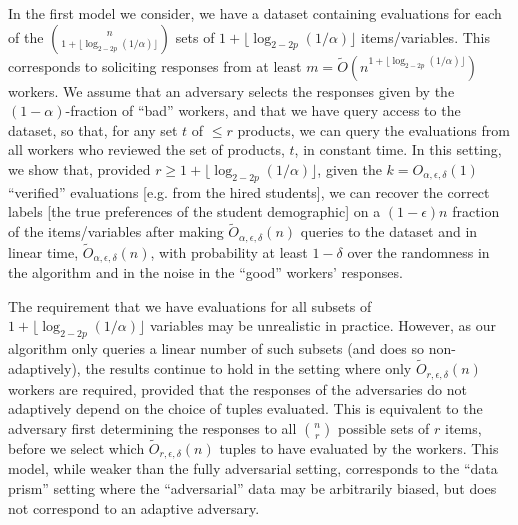 \documentclass[final,12pt]{colt2018}
\newcommand{\eps}{\epsilon}
\begin{document}
In the first model we consider, we have a dataset containing evaluations for each of the ${n \choose 1+\lfloor \log_{2-2p}(1/\alpha)\rfloor}$ sets of $1+\lfloor \log_{2-2p}(1/\alpha)\rfloor$ items/variables.  This corresponds to soliciting responses from at least $m = \tilde{O}\left(n^{1+\lfloor \log_{2-2p}(1/\alpha)\rfloor} \right)$ workers.  We assume that an adversary selects the responses given by the $(1-\alpha)$-fraction of ``bad'' workers, and that we have query access to the dataset, so that, for any set $t$ of $\le r$ products, we can query the evaluations from all workers who reviewed the set of products, $t$, in constant time. In this setting, we show that, provided $r\ge 1+\lfloor \log_{2-2p}(1/\alpha)\rfloor$, given the $k=O_{\alpha,\eps,\delta}(1)$ ``verified'' evaluations [e.g. from the hired students], we can recover the correct labels [the true preferences of the student demographic] on a $(1-\eps)n$ fraction of the items/variables after making $\tilde{O}_{\alpha,\eps,\delta}(n)$ queries to the dataset and in linear time, $\tilde{O}_{\alpha,\eps,\delta}(n)$, with probability at least $1-\delta$ over the randomness in the algorithm and in the noise in the ``good'' workers' responses.

The requirement that we have evaluations for all subsets of $1+\lfloor \log_{2-2p}(1/\alpha)\rfloor$ variables may be unrealistic in practice.  However, as our algorithm only queries a linear number of such subsets (and does so non-adaptively), the results continue to hold in the setting where only $\tilde{O}_{r,\eps,\delta}(n)$ workers are required, provided that the responses of the adversaries do not adaptively depend on the choice of tuples evaluated.  This is equivalent to the adversary first determining the responses to all ${n \choose r}$ possible sets of $r$ items, before we select which $\tilde{O}_{r,\eps,\delta}(n)$ tuples to have evaluated by the workers.   This model, while weaker than the fully adversarial setting, corresponds to the ``data prism'' setting where the ``adversarial'' data may be arbitrarily biased, but does not correspond to an adaptive adversary.

\end{document}
